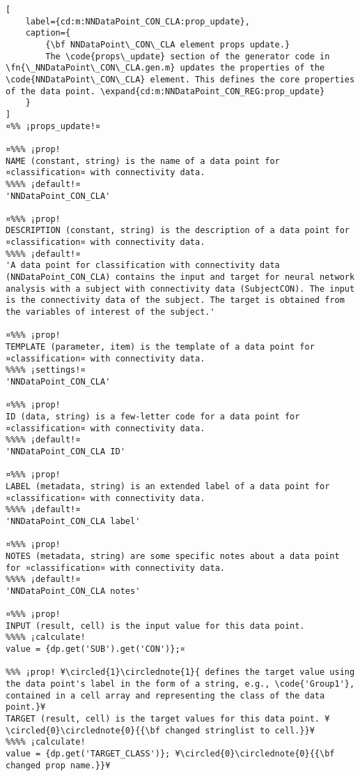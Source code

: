 \documentclass{tufte-handout}
\begin{document}
\begin{lstlisting}[
	label={cd:m:NNDataPoint_CON_CLA:prop_update},
	caption={
		{\bf NNDataPoint\_CON\_CLA element props update.}
		The \code{props\_update} section of the generator code in \fn{\_NNDataPoint\_CON\_CLA.gen.m} updates the properties of the \code{NNDataPoint\_CON\_CLA} element. This defines the core properties of the data point. \expand{cd:m:NNDataPoint_CON_REG:prop_update}
	}
]
¤%% ¡props_update!¤

¤%%% ¡prop!
NAME (constant, string) is the name of a data point for ¤classification¤ with connectivity data.
%%%% ¡default!¤
'NNDataPoint_CON_CLA'

¤%%% ¡prop!
DESCRIPTION (constant, string) is the description of a data point for ¤classification¤ with connectivity data.
%%%% ¡default!¤
'A data point for classification with connectivity data (NNDataPoint_CON_CLA) contains the input and target for neural network analysis with a subject with connectivity data (SubjectCON). The input is the connectivity data of the subject. The target is obtained from the variables of interest of the subject.'

¤%%% ¡prop!
TEMPLATE (parameter, item) is the template of a data point for ¤classification¤ with connectivity data.
%%%% ¡settings!¤
'NNDataPoint_CON_CLA'

¤%%% ¡prop!
ID (data, string) is a few-letter code for a data point for ¤classification¤ with connectivity data.
%%%% ¡default!¤
'NNDataPoint_CON_CLA ID'

¤%%% ¡prop!
LABEL (metadata, string) is an extended label of a data point for ¤classification¤ with connectivity data.
%%%% ¡default!¤
'NNDataPoint_CON_CLA label'

¤%%% ¡prop!
NOTES (metadata, string) are some specific notes about a data point for ¤classification¤ with connectivity data.
%%%% ¡default!¤
'NNDataPoint_CON_CLA notes'

¤%%% ¡prop!
INPUT (result, cell) is the input value for this data point.
%%%% ¡calculate!
value = {dp.get('SUB').get('CON')};¤
    
%%% ¡prop! ¥\circled{1}\circlednote{1}{ defines the target value using the data point's label in the form of a string, e.g., \code{'Group1'}, contained in a cell array and representing the class of the data point.}¥
TARGET (result, cell) is the target values for this data point. ¥\circled{0}\circlednote{0}{{\bf changed stringlist to cell.}}¥
%%%% ¡calculate!
value = {dp.get('TARGET_CLASS')}; ¥\circled{0}\circlednote{0}{{\bf changed prop name.}}¥
\end{lstlisting}
\end{document}
